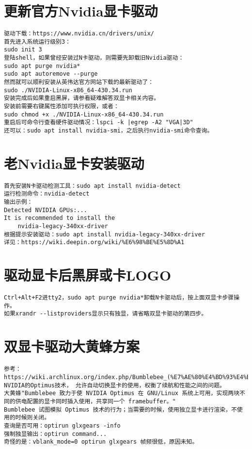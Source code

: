\documentclass[a4paper,fontset=fandol,zihao=-4,linespread=1.2,oneside]{ctexbook}
\begin{document}
\section{更新官方Nvidia显卡驱动}
\begin{lstlisting}
驱动下载：https://www.nvidia.cn/drivers/unix/
首先进入系统运行级别3：
sudo init 3
登陆shell，如果曾经安装过N卡驱动，则需要先卸载旧Nvidia驱动：
sudo apt purge nvidia*
sudo apt autoremove --purge
然而就可以顺利安装从英伟达官方网站下载的最新驱动了：
sudo ./NVIDIA-Linux-x86_64-430.34.run
安装完成后如果重启黑屏，请参看疑难解答双显卡相关内容。
安装前需要右键属性添加可执行权限，或者：
sudo chmod +x ./NVIDIA-Linux-x86_64-430.34.run
重启后可命令行查看硬件驱动情况：lspci -k |egrep -A2 "VGA|3D"
还可以：sudo apt install nvidia-smi，之后执行nvidia-smi命令查询。
\end{lstlisting}

\section{老Nvidia显卡安装驱动}
\begin{lstlisting}
首先安装N卡驱动检测工具：sudo apt install nvidia-detect
运行检测命令：nvidia-detect
输出示例：
Detected NVIDIA GPUs:...
It is recommended to install the
    nvidia-legacy-340xx-driver
根据提示安装驱动：sudo apt install nvidia-legacy-340xx-driver
详见：https://wiki.deepin.org/wiki/%E6%98%BE%E5%8D%A1
\end{lstlisting}

\section{驱动显卡后黑屏或卡LOGO}
\begin{lstlisting}
Ctrl+Alt+F2进tty2，sudo apt purge nvidia*卸载N卡驱动后，按上面双显卡步骤操作。
如果xrandr --listproviders显示只有独显，请省略双显卡驱动的第四步。
\end{lstlisting}

\section{双显卡驱动大黄蜂方案}
\begin{lstlisting}
参考：https://wiki.archlinux.org/index.php/Bumblebee_(%E7%AE%80%E4%BD%93%E4%B8%AD%E6%96%87)
NVIDIA的Optimus技术， 允许自动切换显卡的使用，权衡了续航和性能之间的问题。
大黄蜂"Bumblebee 致力于使 NVIDIA Optimus 在 GNU/Linux 系统上可用，实现两块不同的供电配置的显卡同时插入使用，共享同一个 framebuffer。"
Bumblebee 试图模拟 Optimus 技术的行为；当需要的时候，使用独立显卡进行渲染，不使用的时候则关闭。
查询是否可用：optirun glxgears -info
强制独显输出：optirun command...
奇怪的是：vblank_mode=0 optirun glxgears 帧频很低，原因未知。
\end{lstlisting}
\end{document}
